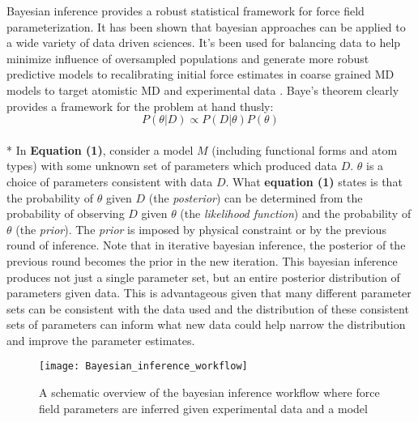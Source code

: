 \documentclass[rmp,nofootinbib,superscriptaddress,12pt,tightenlines,notitlepage]{revtex4-1}
\begin{document}
Bayesian inference provides a robust statistical framework for force field parameterization. It has been shown that 
bayesian approaches can be applied to a wide variety of data driven sciences. It's been used for balancing data to 
help minimize influence of oversampled populations and generate more robust predictive models\cite{bayes_imbalance} 
to recalibrating initial force estimates in coarse grained MD models to target atomistic MD and experimental data
\cite{bayes_coarse}. Baye's theorem clearly provides a framework for the problem at hand thusly:
\begin{equation} P\left(\theta|D\right) \propto P\left(D|\theta\right) P\left(\theta\right)\end{equation}\\*
In \textbf{Equation (1)}, consider a model $M$ (including functional forms and atom types) with some unknown set of 
parameters which produced data $D$. $\theta$ is a choice of parameters consistent with data $D$. What \textbf{equation 
(1)} states is that the probability of $\theta$ given $D$ (the \textit{posterior}) can be determined from the probability 
of observing $D$ given $\theta$ (the \textit{likelihood function}) and the probability of $\theta$ (the \textit{prior}). The 
\textit{prior} is imposed by physical constraint or by the previous round of inference. Note that in 
iterative bayesian inference, the posterior of the previous round becomes the prior in the new iteration. This bayesian 
inference produces not just a single parameter set, but an entire posterior distribution of parameters given data. This is advantageous 
given that many different parameter sets can be consistent with the data used and the distribution of these consistent 
sets of parameters can inform what new data could help narrow the distribution and improve the parameter estimates. 
 \begin{figure}[h!]
  \centering
  \texttt{[image: Bayesian\_inference\_workflow]}
  \caption{A schematic overview of the bayesian inference workflow where force field parameters are inferred given experimental data and a model}
 \end{figure}
\end{document}

